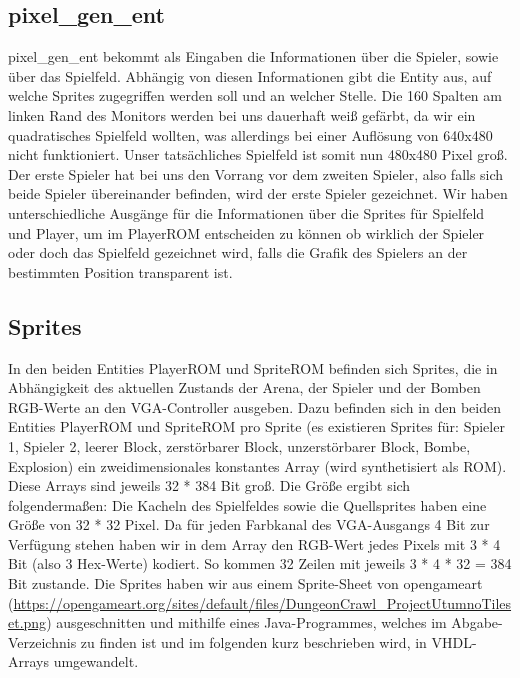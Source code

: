 \documentclass[parskip=full]{scrartcl}
\begin{document}
			\subsection{pixel\_gen\_ent}
				pixel\_gen\_ent bekommt als Eingaben die Informationen über die Spieler, sowie über das Spielfeld. Abhängig von diesen Informationen gibt die Entity aus, auf welche Sprites zugegriffen werden soll und an welcher Stelle.\newline
				Die 160 Spalten am linken Rand des Monitors werden bei uns dauerhaft weiß gefärbt, da wir ein quadratisches Spielfeld wollten, was allerdings bei einer Auflösung von 640x480 nicht funktioniert. Unser tatsächliches Spielfeld ist somit nun 480x480 Pixel groß.\newline
				Der erste Spieler hat bei uns den Vorrang vor dem zweiten Spieler, also falls sich beide Spieler übereinander befinden, wird der erste Spieler gezeichnet.\newline
				Wir haben unterschiedliche Ausgänge für die Informationen über die Sprites für Spielfeld und Player, um im PlayerROM entscheiden zu können ob wirklich der Spieler oder doch das Spielfeld gezeichnet wird, falls die Grafik des Spielers an der bestimmten Position transparent ist.
		
			\subsection{Sprites}
				In den beiden Entities PlayerROM und SpriteROM befinden sich Sprites, die in Abhängigkeit des aktuellen Zustands der Arena, der Spieler und der Bomben RGB-Werte an den VGA-Controller ausgeben. Dazu befinden sich in den beiden Entities PlayerROM und SpriteROM pro Sprite (es existieren Sprites für: Spieler 1, Spieler 2, leerer Block, zerstörbarer Block, unzerstörbarer Block, Bombe, Explosion) ein zweidimensionales konstantes Array (wird synthetisiert als ROM). Diese Arrays sind jeweils 32 * 384 Bit groß. \newline
				Die Größe ergibt sich folgendermaßen: Die Kacheln des Spielfeldes sowie die Quellsprites haben eine Größe von 32 * 32 Pixel. Da für jeden Farbkanal des VGA-Ausgangs 4 Bit zur Verfügung stehen haben wir in dem Array den RGB-Wert jedes Pixels mit 3 * 4 Bit (also 3 Hex-Werte) kodiert. So kommen 32 Zeilen mit jeweils 
				3 * 4 * 32 = 384 Bit zustande. \newline
				Die Sprites haben wir aus einem Sprite-Sheet von opengameart (\url{https://opengameart.org/sites/default/files/DungeonCrawl_ProjectUtumnoTileset.png}) ausgeschnitten und mithilfe eines Java-Programmes, welches im Abgabe-Verzeichnis zu finden ist und im folgenden kurz beschrieben wird, in VHDL-Arrays umgewandelt.
\end{document}

